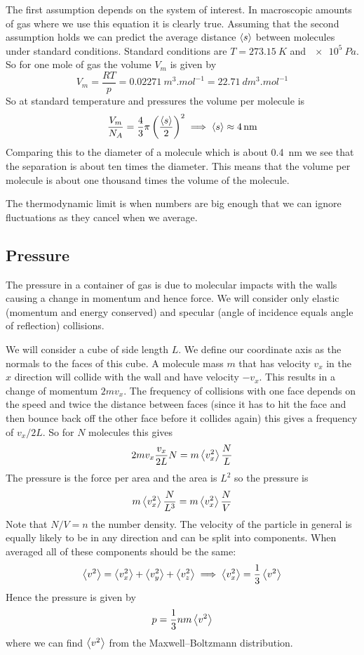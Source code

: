 \documentclass{article}
\begin{document}
    The first assumption depends on the system of interest.
    In macroscopic amounts of gas where we use this equation it is clearly true.
    Assuming that the second assumption holds we can predict the average distance \(\left\langle{s}\right\rangle\) between molecules under standard conditions.
    Standard conditions are \(T = \SI{273.15}{K}\) and \(\SI{e5}{Pa}\).
    So for one mole of gas the volume \(V_m\) is given by
    \[V_m = \frac{RT}{p} = \SI{0.02271}{m^3.mol^{-1}} = \SI{22.71}{dm^{3}.mol^{-1}}\]
    So at standard temperature and pressures the volume per molecule is
    \[\frac{V_m}{N_A} = \frac{4}{3}\pi\left(\frac{\left\langle{s}\right\rangle}{2}\right)^2 \implies \left\langle{s}\right\rangle \approx \SI{4}{nm}\]
    Comparing this to the diameter of a molecule which is about \SI{0.4}{nm} we see that the separation is about ten times the diameter.
    This means that the volume per molecule is about one thousand times the volume of the molecule.
    
    The thermodynamic limit is when numbers are big enough that we can ignore fluctuations as they cancel when we average.
    
    \subsection{Pressure}
    The pressure in a container of gas is due to molecular impacts with the walls causing a change in momentum and hence force.
    We will consider only elastic (momentum and energy conserved) and specular (angle of incidence equals angle of reflection) collisions.
    
    We will consider a cube of side length \(L\).
    We define our coordinate axis as the normals to the faces of this cube.
    A molecule mass \(m\) that has velocity \(v_x\) in the \(x\) direction will collide with the wall and have velocity \(-v_x\).
    This results in a change of momentum \(2mv_x\).
    The frequency of collisions with one face depends on the speed and twice the distance between faces (since it has to hit the face and then bounce back off the other face before it collides again) this gives a frequency of \(v_x/2L\).
    So for \(N\) molecules this gives
    \[2mv_x\frac{v_x}{2L}N = m\left\langle{v_x^2}\right\rangle\frac{N}{L}\]
    The pressure is the force per area and the area is \(L^2\) so the pressure is
    \[m\left\langle{v_x^2}\right\rangle\frac{N}{L^3} = m\left\langle{v_x^2}\right\rangle\frac{N}{V}\]
    Note that \(N/V = n\) the number density.
    The velocity of the particle in general is equally likely to be in any direction and can be split into components.
    When averaged all of these components should be the same:
    \[\left\langle{v^2}\right\rangle = \left\langle{v_x^2}\right\rangle + \left\langle{v_y^2}\right\rangle + \left\langle{v_z^2}\right\rangle \implies \left\langle{v_x^2}\right\rangle = \frac{1}{3}\left\langle{v^2}\right\rangle\]
    Hence the pressure is given by
    \[p = \frac{1}{3}nm\left\langle{v^2}\right\rangle\]
    where we can find \(\left\langle{v^2}\right\rangle\) from the Maxwell--Boltzmann distribution.
    
\end{document}
